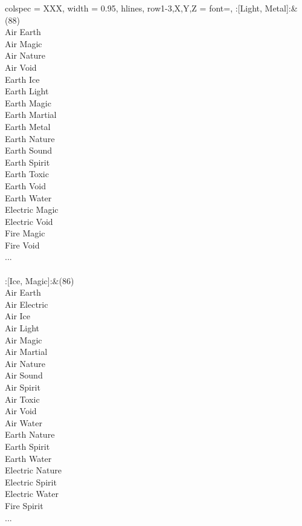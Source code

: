 \begin{longtblr}[
	caption = {2v2 Attacking Effective},
	label = {2v2-Attacking-Effective},
]{
	colspec = {XXX}, width = 0.95\linewidth,
	hlines,
	row{1-3,X,Y,Z} = {font=\bfseries},
}
	:[Light, Metal]:&{(88)\\
	Air Earth \\
	Air Magic \\
	Air Nature \\
	Air Void \\
	Earth Ice \\
	Earth Light \\
	Earth Magic \\
	Earth Martial \\
	Earth Metal \\
	Earth Nature \\
	Earth Sound \\
	Earth Spirit \\
	Earth Toxic \\
	Earth Void \\
	Earth Water \\
	Electric Magic \\
	Electric Void \\
	Fire Magic \\
	Fire Void \\
	...\\
	}\\

	:[Ice, Magic]:&{(86)\\
	Air Earth \\
	Air Electric \\
	Air Ice \\
	Air Light \\
	Air Magic \\
	Air Martial \\
	Air Nature \\
	Air Sound \\
	Air Spirit \\
	Air Toxic \\
	Air Void \\
	Air Water \\
	Earth Nature \\
	Earth Spirit \\
	Earth Water \\
	Electric Nature \\
	Electric Spirit \\
	Electric Water \\
	Fire Spirit \\
	...\\
	}\\


\end{longtblr}
